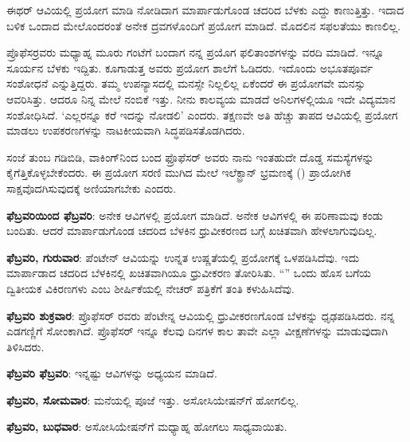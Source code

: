 \vskip 1pt

ಈಥರ್ ಆವಿಯಲ್ಲಿ ಪ್ರಯೋಗ ಮಾಡಿ ನೋಡಿದಾಗ ಮಾರ್ಪಾಡುಗೊಂಡ ಚದರಿದ ಬೆಳಕು ಎದ್ದು ಕಾಣುತ್ತಿತ್ತು. ಇದಾದ ಬಳಿಕ ಒಂದಾದ ಮೇಲೊಂದರಂತೆ ಅನೇಕ ದ್ರವಗಳೊಂದಿಗೆ ಪ್ರಯೋಗ ಮಾಡಿದೆ. ಮೊದಲಿನ ಸಫಲತೆಯು ಕಾಣಲಿಲ್ಲ.

\vskip 1pt

ಪ್ರೊಫೆಸರ್‍ರವರು ಮಧ್ಯಾಹ್ನ ಮೂರು ಗಂಟೆಗೆ ಬಂದಾಗ ನನ್ನ ಪ್ರಯೊಗ ಫಲಿತಾಂಶಗಳನ್ನು ವರದಿ ಮಾಡಿದೆ. ಇನ್ನೂ ಸೂರ್ಯನ ಬೆಳಕು ಇದ್ದಿತು. ಕೂಗಾಡುತ್ತ ಅವರು ಪ್ರಯೋಗ ಶಾಲೆಗೆ ಓಡಿದರು. ಇದೊಂದು ಅಭೂತಪೂರ್ವ ಸಂಶೋಧನೆ ಎನ್ನುತ್ತಿದ್ದರು. ತಮ್ಮ ಉಪನ್ಯಾಸದಲ್ಲಿ ಮನಸ್ಸೇ ನಿಲ್ಲಲಿಲ್ಲ ಏಕೆಂದರೆ ಈ ಪ್ರಯೋಗವೇ ಮನಸ್ಸು ಆವರಿಸಿತ್ತು. ಆದರೂ ನಿನ್ನ ಮೇಲೆ ನಂಬಿಕೆ ಇತ್ತು. ನೀನು ಕಾಲವ್ಯಯ ಮಾಡದೆ ಅನಿಲಗಳಲ್ಲಿಯೂ ಇದೇ ವಿದ್ಯಮಾನ ಸಂಶೋಧಿಸಿದೆ. ‘ಎಲ್ಲರನ್ನೂ ಕರೆ ಇದನ್ನು ನೋಡಲಿ’ ಎಂದರು. ತಕ್ಷಣವೇ ಅತಿ ಹೆಚ್ಚು ತಾಪದ ಆವಿಯಲ್ಲಿ ಪ್ರಯೋಗ ಮಾಡಲು ಉಪಕರಣಗಳನ್ನು ನಾಟಕೀಯವಾಗಿ ಸಿದ್ಧಪಡಿಸತೊಡಗಿದರು.

\vskip 1pt

ಸಂಜೆ ತುಂಬ ಗಡಿಬಿಡಿ, ವಾಕಿಂಗ್‍ನಿಂದ ಬಂದ ಫ್ರೊಫೆಸರ್ ಅವರು ನಾನು ಇಂತಹುದೇ ದೊಡ್ಡ ಸಮಸ್ಯೆಗಳನ್ನು ಕೈಗೆತ್ತಿಕೊಳ್ಳಬೇಕೆಂದರು. ಈ ಪ್ರಯೋಗ ಸರಣಿ ಮುಗಿದ ಮೇಲೆ ಇಲೆಕ್ಟ್ರಾನ್ ಭ್ರಮಣಕ್ಕೆ () ಪ್ರಾಯೋಗಿಕ ಸಾಕ್ಷವೊದಗಿಸುವುದಕ್ಕೆ ಅಣಿಯಾಗಬೇಕು ಎಂದರು.

\vskip 1pt

\textbf{ ಫೆಬ್ರವರಿಯಿಂದ\general{\enginline{-}} ಫೆಬ್ರವರಿ}: ಅನೇಕ ಆವಿಗಳಲ್ಲಿ ಪ್ರಯೋಗ ಮಾಡಿದೆ. ಅನೇಕ ಆವಿಗಳಲ್ಲಿ ಈ ಪರಿಣಾಮವು ಕಂಡು ಬಂದಿತು. ಆದರೆ ಮಾರ್ಪಾಡುಗೊಂಡ ಚದರಿದ ಬೆಳಕಿನ ಧ್ರುವೀಕರಣದ ಬಗ್ಗೆ ಖಚಿತವಾಗಿ ಹೇಳಲಾಗುವುದಿಲ್ಲ.

\vskip 1pt

\textbf{ ಫೆಬ್ರವರಿ, ಗುರುವಾರ}: ಪೆಂಟೇನ್ ಆವಿಯನ್ನು ಉನ್ನತ ಉಷ್ಣತೆಯಲ್ಲಿ ಪ್ರಯೋಗಕ್ಕೆ ಒಳಪಡಿಸಿದೆವು. ಇದು ಮಾರ್ಪಾಡಾದ ಚದರಿದ ಬೆಳಕಿನಲ್ಲಿ ಖಚಿತವಾಗಿಯೂ ಧ್ರುವೀಕರಣ ತೋರಿಸಿತು. “\textit{}” ಒಂದು ಹೊಸ ಬಗೆಯ ದ್ವಿತೀಯಕ ವಿಕಿರಣಗಳು ಎಂಬ ಶೀರ್ಷಿಕೆಯಲ್ಲಿ ನೇಚರ್ ಪತ್ರಿಕೆಗೆ ತಂತಿ ಕಳುಹಿಸಿದೆವು.

\textbf{ ಫೆಬ್ರವರಿ ಶುಕ್ರವಾರ}: ಪ್ರೊಫೆಸರ್ ರವರು ಪೆಂಟೇನ್ನ ಆವಿಯಲ್ಲಿ ಧ್ರುವೀಕರಣಗೊಂಡ ಬೆಳಕನ್ನು ಧೃಢಪಡಿಸಿದರು. ನನ್ನ ಎಡಗಣ್ಣಿಗೆ ಸೋಂಕಾಗಿದೆ. ಪ್ರೊಫೆಸರ್ ಇನ್ನೂ ಕೆಲವು ದಿನಗಳ ಕಾಲ ತಾವೇ ಎಲ್ಲಾ ವೀಕ್ಷಣೆಗಳನ್ನು ಮಾಡುವುದಾಗಿ ತಿಳಿಸಿದರು. 

\textbf{ ಫೆಬ್ರವರಿ\general{\enginline{-}} ಫೆಬ್ರವರಿ}: ಇನ್ನಷ್ಟು ಆವಿಗಳನ್ನು ಅಧ್ಯಯನ ಮಾಡಿದೆ.

\textbf{ ಫೆಬ್ರವರಿ, ಸೋಮವಾರ}: ಮನೆಯಲ್ಲಿ ಪೂಜೆ ಇತ್ತು. ಅಸೋಸಿಯೇಷನ್‍ಗೆ ಹೋಗಲಿಲ್ಲ.

\textbf{ ಫೆಬ್ರವರಿ, ಬುಧವಾರ}: ಅಸೋಸಿಯೇಷನ್‍ಗೆ ಮಧ್ಯಾಹ್ನ ಹೋಗಲು ಸಾಧ್ಯವಾಯಿತು.

